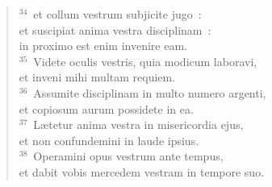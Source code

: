 \begin{verse}
${}^{34}$~et collum vestrum subjicite jugo~:\\ et suscipiat anima vestra disciplinam~:\\ in proximo est enim invenire eam.\\
${}^{35}$~Videte oculis vestris, quia modicum laboravi,\\ et inveni mihi multam requiem.\\
${}^{36}$~Assumite disciplinam in multo numero argenti,\\ et copiosum aurum possidete in ea.\\
${}^{37}$~L\ae tetur anima vestra in misericordia ejus,\\ et non confundemini in laude ipsius.\\
${}^{38}$~Operamini opus vestrum ante tempus,\\ et dabit vobis mercedem vestram in tempore suo.\end{verse}


